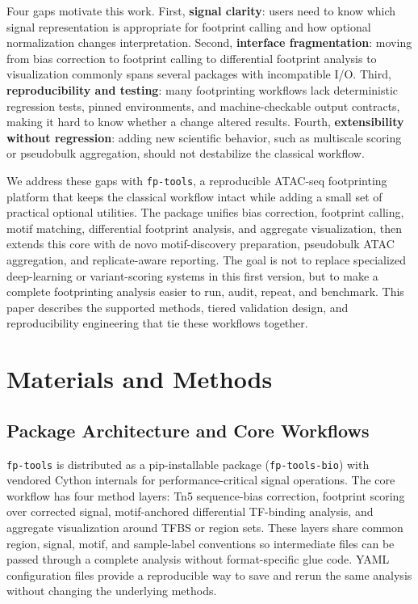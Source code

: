 \documentclass[biomedinformatics,article,submit,pdftex,moreauthors]{Definitions/mdpi}
\begin{document}
Four gaps motivate this work. First, \textbf{signal clarity}: users need to know
which signal representation is appropriate for footprint calling and how optional
normalization changes interpretation. Second, \textbf{interface fragmentation}:
moving from bias correction to footprint calling to differential footprint analysis to
visualization commonly spans several packages with incompatible I/O. Third,
\textbf{reproducibility and testing}: many footprinting workflows lack
deterministic regression tests, pinned environments, and machine-checkable output
contracts, making it hard to know whether a change altered results. Fourth,
\textbf{extensibility without regression}: adding new scientific behavior, such
as multiscale scoring or pseudobulk aggregation, should not destabilize the
classical workflow.

We address these gaps with \texttt{fp-tools}, a reproducible ATAC-seq
footprinting platform that keeps the classical workflow intact while adding a
small set of practical optional utilities. The package unifies bias
correction, footprint calling, motif matching, differential footprint analysis, and aggregate
visualization, then extends this core with de novo motif-discovery preparation, pseudobulk ATAC
aggregation, and replicate-aware reporting. The goal is not to replace specialized deep-learning or variant-scoring
systems in this first version, but to make a complete footprinting analysis easier
to run, audit, repeat, and benchmark. This paper describes the supported methods,
tiered validation design, and reproducibility engineering that tie these workflows
together.

\section{Materials and Methods}

\subsection{Package Architecture and Core Workflows}

\texttt{fp-tools} is distributed as a pip-installable package (\texttt{fp-tools-bio})
with vendored Cython internals for performance-critical signal operations. The
core workflow has four method layers: Tn5 sequence-bias correction, footprint
scoring over corrected signal, motif-anchored differential TF-binding analysis,
and aggregate visualization around TFBS or region sets. These layers share common
region, signal, motif, and sample-label conventions so intermediate files can be
passed through a complete analysis without format-specific glue code. YAML
configuration files provide a reproducible way to save and rerun the same analysis
without changing the underlying methods.
\end{document}
